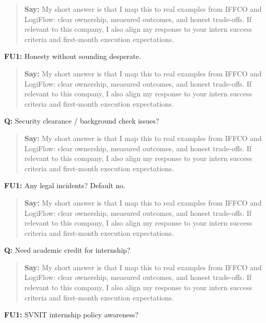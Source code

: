 \documentclass[9pt,a4paper]{article}
\begin{document}
\begin{quote}\small\textbf{Say:} My short answer is that I map this to real examples from IFFCO and LogiFlow: clear ownership, measured outcomes, and honest trade-offs. If relevant to this company, I also align my response to your intern success criteria and first-month execution expectations.\end{quote}
\vspace{2mm}
\textbf{FU1:} Honesty without sounding desperate.

\begin{quote}\small\textbf{Say:} My short answer is that I map this to real examples from IFFCO and LogiFlow: clear ownership, measured outcomes, and honest trade-offs. If relevant to this company, I also align my response to your intern success criteria and first-month execution expectations.\end{quote}
\vspace{2mm}
\textbf{Q:} Security clearance / background check issues?

\begin{quote}\small\textbf{Say:} My short answer is that I map this to real examples from IFFCO and LogiFlow: clear ownership, measured outcomes, and honest trade-offs. If relevant to this company, I also align my response to your intern success criteria and first-month execution expectations.\end{quote}
\vspace{2mm}
\textbf{FU1:} Any legal incidents? Default no.

\begin{quote}\small\textbf{Say:} My short answer is that I map this to real examples from IFFCO and LogiFlow: clear ownership, measured outcomes, and honest trade-offs. If relevant to this company, I also align my response to your intern success criteria and first-month execution expectations.\end{quote}
\vspace{2mm}
\textbf{Q:} Need academic credit for internship?

\begin{quote}\small\textbf{Say:} My short answer is that I map this to real examples from IFFCO and LogiFlow: clear ownership, measured outcomes, and honest trade-offs. If relevant to this company, I also align my response to your intern success criteria and first-month execution expectations.\end{quote}
\vspace{2mm}
\textbf{FU1:} SVNIT internship policy awareness?
\end{document}
